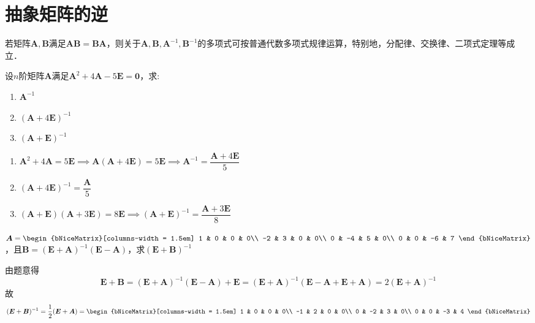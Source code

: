 \documentclass[12pt, a4paper, oneside, UTF8]{ctexbook}
\begin{document}
\section{抽象矩阵的逆}
\begin{theorem}
    若矩阵$\bm{A},\bm{B}$满足$\bm{AB}=\bm{BA}$，则关于$\bm{A},\bm{B},\bm{A}^{-1},\bm{B}^{-1}$的多项式可按普通代数多项式规律运算，特别地，分配律、交换律、二项式定理等成立．
\end{theorem}
\begin{example}
    设$n$阶矩阵$\bm{A}$满足$\bm{A}^2 + 4\bm{A} - 5\bm{E} = \bm{0}$，求:
    \begin{enumerate}[label = (\arabic*)]
        \item $\bm{A}^{-1}$
        \item $(\bm{A}+4\bm{E})^{-1}$
        \item $(\bm{A}+\bm{E})^{-1}$
    \end{enumerate}
\end{example}
\begin{solution}
    \begin{enumerate}[label = (\arabic*)]
        \item $\bm{A}^2 + 4\bm{A} = 5\bm{E} \implies \bm{A}(\bm{A} + 4\bm{E}) = 5\bm{E} \implies \bm{A}^{-1} = \dfrac{\bm{A} + 4\bm{E}}{5}$
        \item $(\bm{A}+4\bm{E})^{-1} = \dfrac{\bm{A}}{5}$
        \item $(\bm{A}+\bm{E})(\bm{A}+3\bm{E}) = 8\bm{E} \implies (\bm{A}+\bm{E})^{-1} = \dfrac{\bm{A}+3\bm{E}}{8}$
    \end{enumerate}
\end{solution}
\begin{example}
    $\bm{A}=\begin{bNiceMatrix}[columns-width = 1.5em]
        1 & 0 & 0 & 0\\
        -2 & 3 & 0 & 0\\
        0 & -4 & 5 & 0\\
        0 & 0 & -6 & 7
    \end{bNiceMatrix}$，且$\bm{B}=(\bm{E}+\bm{A})^{-1}(\bm{E}-\bm{A})$，求$(\bm{E}+\bm{B})^{-1}$
\end{example}
\begin{solution}
    由题意得
    \[
        \bm{E} + \bm{B} = (\bm{E}+\bm{A})^{-1}(\bm{E}-\bm{A}) + \bm{E} = (\bm{E}+\bm{A})^{-1}(\bm{E}-\bm{A} + \bm{E} + \bm{A}) = 2(\bm{E}+\bm{A})^{-1}
    \]
    故
    \[
        (\bm{E}+\bm{B})^{-1} = \dfrac{1}{2}(\bm{E}+\bm{A}) =
        \begin{bNiceMatrix}[columns-width = 1.5em]
            1 & 0 & 0 & 0\\
            -1 & 2 & 0 & 0\\
            0 & -2 & 3 & 0\\
            0 & 0 & -3 & 4
        \end{bNiceMatrix}
    \]
\end{solution}
\end{document}
